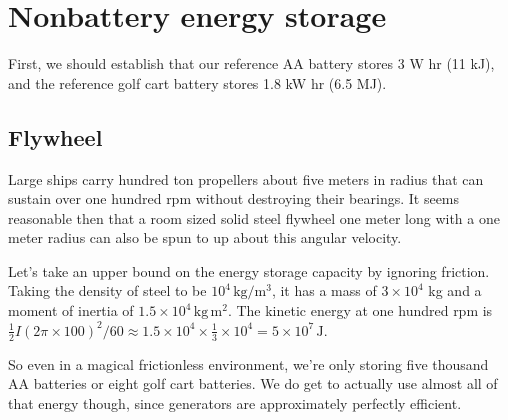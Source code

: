 \documentclass[12pt]{article}
\begin{document}
\section{Nonbattery energy storage}

First, we should establish that our reference AA battery stores 3 W hr (11 kJ), and the reference golf cart battery stores 1.8 kW hr (6.5 MJ).

\subsection{Flywheel}


Large ships carry hundred ton propellers about five meters in radius that can sustain over one hundred rpm without destroying their bearings. It seems reasonable then that a room sized solid steel flywheel one meter long with a one meter radius can also be spun to up about this angular velocity.

Let's take an upper bound on the energy storage capacity by ignoring friction. Taking the density of steel to be \(10^4\,\mathrm{kg}/\mathrm{m}^3\), it has a mass of \(3 \times 10^{4}\) kg and a moment of inertia of \(1.5 \times 10^{4}\,\mathrm{kg}\,\mathrm{m}^2\). The kinetic energy at one hundred rpm is \(\frac{1}{2}I(2\pi \times 100)^2/60 \approx 1.5\times10^4 \times \frac{1}{3} \times 10^4 = 5 \times 10^7\,\mathrm{J}\).

So even in a magical frictionless environment, we're only storing five thousand AA batteries or eight golf cart batteries. We do get to actually use almost all of that energy though, since generators are approximately perfectly efficient.
\end{document}

